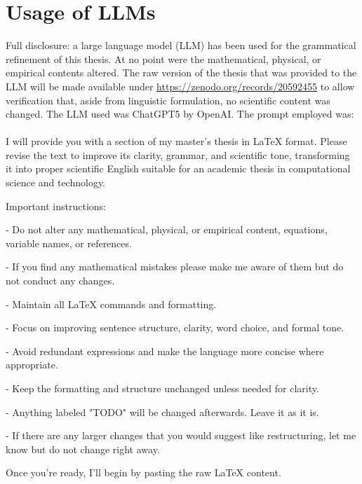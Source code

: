 \section{Usage of LLMs}
Full disclosure: a large language model (LLM) has been used for the grammatical refinement of this thesis. At no point were the mathematical, physical, or empirical contents altered. The raw version of the thesis that was provided to the LLM will be made available under \url{https://zenodo.org/records/20592455} to allow verification that, aside from linguistic formulation, no scientific content was changed. The LLM used was ChatGPT5 by OpenAI. The prompt employed was:\\
\\
I will provide you with a section of my master's thesis in LaTeX format. Please revise the text to improve its clarity, grammar, and scientific tone, transforming it into proper scientific English suitable for an academic thesis in computational science and technology.

Important instructions:

- Do not alter any mathematical, physical, or empirical content, equations, variable names, or references.

- If you find any mathematical mistakes please make me aware of them but do not conduct any changes.

- Maintain all LaTeX commands and formatting.

- Focus on improving sentence structure, clarity, word choice, and formal tone.

- Avoid redundant expressions and make the language more concise where appropriate.

- Keep the formatting and structure unchanged unless needed for clarity.

- Anything labeled "TODO" will be changed afterwards. Leave it as it is.

- If there are any larger changes that you would suggest like restructuring, let me know but do not change right away.

Once you're ready, I’ll begin by pasting the raw LaTeX content.

